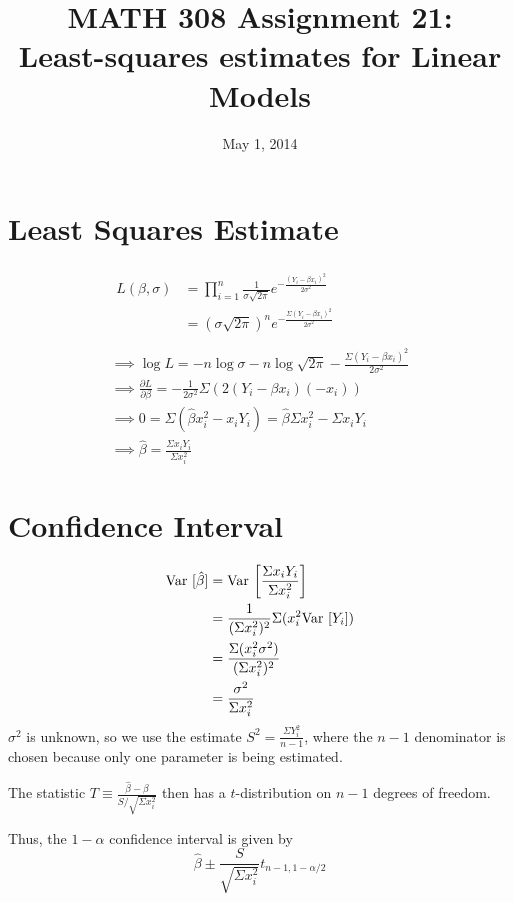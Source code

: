 \documentclass[twocolumn]{article}
\title{MATH 308 Assignment 21:\\Least-squares estimates for Linear Models}
\date{May 1, 2014}
\begin{document}
\maketitle

\section{Least Squares Estimate}

\begin{gather*}
\begin{aligned}
L(\beta,\sigma)
&=\prod_{i=1}^n\frac{1}{\sigma\sqrt{2\pi}}
	e^{-\frac{(Y_i-\beta x_i)^2}{2\sigma^2}}\\
&=(\sigma\sqrt{2\pi})^n e^{-\frac{\Sigma(Y_i-\beta x_i)^2}{2\sigma^2}}\\
\end{aligned}\\
\implies \log L=-n\log\sigma-n\log\sqrt{2\pi}-\frac{\Sigma(Y_i-\beta x_i)^2}{2\sigma^2}\\
\implies\frac{\partial L}{\partial\beta}=-\frac{1}{2\sigma^2}\Sigma(2(Y_i-\beta x_i)(-x_i))\\
\implies 0=\Sigma(\hat\beta x_i^2-x_iY_i)=\hat\beta\Sigma x_i^2-\Sigma x_iY_i\\
\implies \hat\beta=\frac{\Sigma x_iY_i}{\Sigma x_i^2}
\end{gather*}

\newpage

\section{Confidence Interval}
\begin{align*}
\mathrm{Var}\text{ }{[\hat\beta]}&=\mathrm{Var}\text{ }{\left[\frac{\Sigma x_iY_i}{\Sigma x_i^2}\right]}\\
&=\frac{1}{(\Sigma x_i^2)^2}\Sigma(x_i^2\mathrm{Var}\text{ }{[Y_i]})\\
&=\frac{\Sigma(x_i^2\sigma^2)}{(\Sigma x_i^2)^2}\\
&=\frac{\sigma^2}{\Sigma x_i^2}
\end{align*}
$\sigma^2$ is unknown, so we use the estimate $S^2=\frac{\Sigma Y_i^2}{n-1}$, where the $n-1$ denominator is chosen because only one parameter is being estimated.

The statistic $T\equiv\frac{\hat \beta-\beta}{S/\sqrt{\Sigma x_i^2}}$ then has a $t$-distribution on $n-1$ degrees of freedom.

Thus, the $1-\alpha$ confidence interval is given by
\[\hat\beta\pm \frac{S}{\sqrt{\Sigma x_i^2}}t_{n-1,1-\alpha/2}\]
\end{document}
